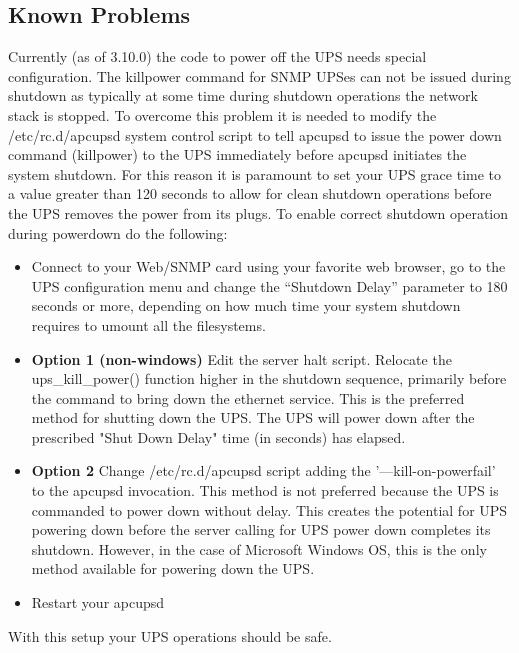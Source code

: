 {{{{{{{\label{Known-Problems}

\subsection*{Known Problems}

Currently (as of 3.10.0) the code to power off the UPS needs special
configuration. The killpower command for SNMP UPSes can not be issued during
shutdown as typically at some time during shutdown operations the network
stack is stopped. To overcome this problem it is needed to modify the
/etc/rc.d/apcupsd system control script to tell apcupsd to issue the power
down command (killpower) to the UPS immediately before apcupsd initiates the
system shutdown. For this reason it is paramount to set your UPS grace time to
a value greater than 120 seconds to allow for clean shutdown operations before
the UPS removes the power from its plugs. To enable correct shutdown operation
during powerdown do the following:  

\begin{itemize}
\item Connect to your Web/SNMP card using your favorite web browser, go to the
   UPS configuration menu and change the ``Shutdown Delay'' parameter to 180
   seconds or more, depending on how much time your system shutdown requires to
umount all the filesystems.
\item {\bf Option 1 (non-windows)} Edit the server halt script.  Relocate the 
ups\_kill\_power() function higher in the shutdown sequence, primarily before
the command to bring down the ethernet service. This is the preferred method
for shutting down the UPS.  The UPS will power down after the prescribed
"Shut Down Delay" time (in seconds) has elapsed.
\item {\bf Option 2} Change /etc/rc.d/apcupsd script adding the '{---}kill-on-powerfail'
to the apcupsd invocation.  This method is not preferred because the UPS is
commanded to power down without delay.  This creates the potential for UPS
powering down before the server calling for UPS power down completes its shutdown.
However, in the case of Microsoft Windows OS, this is the only method available
for powering down the UPS.
\item Restart your apcupsd 
   \end{itemize}

With this setup your UPS operations should be safe. 


}}}}}}}
